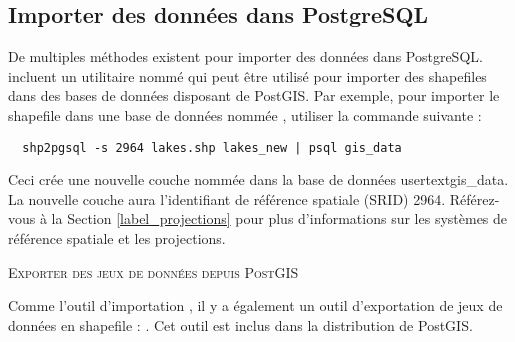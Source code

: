 \subsection{Importer des données dans PostgreSQL} \label{sec:loading_postgis_data}

De multiples méthodes existent pour importer des données dans PostgreSQL. \pg incluent un utilitaire nommé  qui peut être utilisé pour importer des shapefiles dans des bases de données disposant de PostGIS. Par exemple, pour importer le shapefile  dans une base de données \psq nommée , utiliser la commande suivante :

\begin{verbatim}
  shp2pgsql -s 2964 lakes.shp lakes_new | psql gis_data
\end{verbatim}

Ceci crée une nouvelle couche nommée  dans la base de données usertext{gis\_data}. La nouvelle couche aura l'identifiant de référence spatiale (SRID) 2964. Référez-vous à la Section \ref{label_projections} pour plus d'informations sur les systèmes de référence spatiale et les projections.
\begin{Tip}
\caption{\textsc{Exporter des jeux de données depuis PostGIS}}
Comme l'outil d'importation , il y a également un outil d'exportation de jeux de données \pg en shapefile : . Cet outil est inclus dans la distribution de PostGIS.
\end{Tip}

